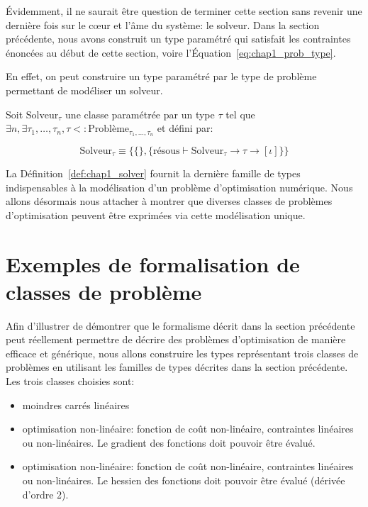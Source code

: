 Évidemment, il ne saurait être question de terminer cette section sans
revenir une dernière fois sur le c\oe ur et l'âme du système: le
solveur. Dans la section précédente, nous avons construit un type
paramétré qui satisfait les contraintes énoncées au début de cette
section, voire l'Équation~\ref{eq:chap1_prob_type}.


En effet, on peut construire un type paramétré par le type de problème
permettant de modéliser un solveur.

\begin{mydef}\label{def:chap1_solver}
  Soit $\text{Solveur}_{\tau}$ une classe paramétrée par un type $\tau$
  tel que $\exists n, \exists \tau_1, \dotsc, \tau_n, \tau <:
  \text{Problème}_{\tau_1, \dotsc, \tau_n}$ et défini par:

  \begin{equation}
    \text{Solveur}_{\tau} \equiv \{ \{ \}, \{ \text{résous} \vdash
    \text{Solveur}_{\tau} \rightarrow \tau \rightarrow [\iota] \} \}
  \end{equation}
\end{mydef}

La Définition~\ref{def:chap1_solver} fournit la dernière famille de
types indispensables à la modélisation d'un problème d'optimisation
numérique. Nous allons désormais nous attacher à montrer que diverses
classes de problèmes d'optimisation peuvent être exprimées via cette
modélisation unique.


\section{Exemples de formalisation de classes de problème}


Afin d'illustrer de démontrer que le formalisme décrit dans la section
précédente peut réellement permettre de décrire des problèmes
d'optimisation de manière efficace et générique, nous allons
construire les types représentant trois classes de problèmes en
utilisant les familles de types décrites dans la section
précédente. Les trois classes choisies sont:

\begin{itemize}
\item moindres carrés linéaires
\item optimisation non-linéaire: fonction de coût non-linéaire,
  contraintes linéaires ou non-linéaires. Le gradient des fonctions
  doit pouvoir être évalué.
\item optimisation non-linéaire: fonction de coût non-linéaire,
  contraintes linéaires ou non-linéaires. Le hessien
  des fonctions doit pouvoir être évalué (dérivée d'ordre 2).
\end{itemize}


